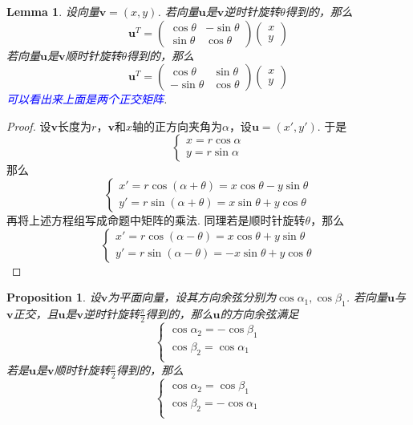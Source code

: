 \documentclass{article}
\newcommand{\mbf}[1]{\bm{#1}}
\newtheorem{lemma}[theorem]{Lemma}
\newtheorem{proposition}[theorem]{Proposition}
\newcommand{\bluet}[1]{\textcolor{blue}{#1}}
\begin{document}
\begin{lemma}
\rm 设向量$\mbf{v}=(x,y)$. 若向量$\mbf{u}$是$\mbf{v}$逆时针旋转$\theta$得到的，那么
$$
\mbf{u}^T = \begin{pmatrix}
\cos\theta & -\sin\theta \\
\sin\theta & \cos\theta
\end{pmatrix} \begin{pmatrix}
x \\
y
\end{pmatrix}
$$
若向量$\mbf{u}$是$\mbf{v}$顺时针旋转$\theta$得到的，那么
$$
\mbf{u}^T = \begin{pmatrix}
\cos\theta & \sin\theta \\
-\sin\theta & \cos\theta
\end{pmatrix} \begin{pmatrix}
x \\
y
\end{pmatrix}
$$
\bluet{可以看出来上面是两个正交矩阵}.
\end{lemma}

\begin{proof}
\rm 设$\mbf{v}$长度为$r$，$\mbf{v}$和$x$轴的正方向夹角为$\alpha$，设$\mbf{u}=(x',y')$.  于是
$$
\left\{
\begin{array}{ll}
x = r\cos\alpha \\
y = r\sin\alpha
\end{array} \right.
$$
那么
$$
\left\{
\begin{array}{ll}
x' = r\cos(\alpha+\theta) = x\cos\theta - y\sin\theta  \\
y' = r\sin(\alpha+\theta) = x\sin\theta + y\cos\theta
\end{array} \right.
$$
再将上述方程组写成命题中矩阵的乘法. 同理若是顺时针旋转$\theta$，那么
$$
\left\{
\begin{array}{ll}
x' = r\cos(\alpha-\theta) = x\cos\theta + y\sin\theta  \\
y' = r\sin(\alpha-\theta) = -x\sin\theta + y\cos\theta
\end{array} \right.
$$
\end{proof}

\begin{proposition}
\rm 设$\mbf{v}$为平面向量，设其方向余弦分别为$\cos\alpha_1,\cos \beta_1$. 若向量$\mbf{u}$与$\mbf{v}$正交，且$\mbf{u}$是$\mbf{v}$逆时针旋转$\frac{\pi}{2}$得到的，那么$\mbf{u}$的方向余弦满足
$$
\left\{
\begin{array}{ll}
\cos\alpha_2 = -\cos\beta_1\\
\cos\beta_2 = \cos\alpha_1\\
\end{array}\right.
$$
若是$\mbf{u}$是$\mbf{v}$顺时针旋转$\frac{\pi}{2}$得到的，那么
$$
\left\{
\begin{array}{ll}
\cos\alpha_2 = \cos\beta_1 \\
\cos\beta_2 = -\cos\alpha_1 \\
\end{array}\right.
$$
\end{proposition}
\end{document}
